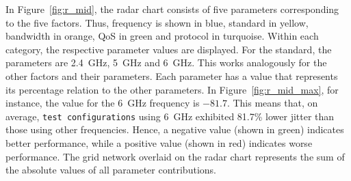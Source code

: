 In Figure~\ref{fig:r_mid}, the radar chart consists of five parameters corresponding to the five factors.  
Thus, frequency is shown in blue, standard in yellow, bandwidth in orange, \ac{QoS} in green and protocol in turquoise.  
Within each category, the respective parameter values are displayed.
For the standard, the parameters are 2.4~GHz, 5~GHz and 6~GHz.
This works analogously for the other factors and their parameters.  
Each parameter has a value that represents its percentage relation to the other parameters.  
In Figure~\ref{fig:r_mid_max}, for instance, the value for the 6~GHz frequency is $-81.7$.  
This means that, on average, \texttt{test configurations} using 6~GHz exhibited 81.7\% lower jitter than those using other frequencies.  
Hence, a negative value (shown in green) indicates better performance, while a positive value (shown in red) indicates worse performance.  
The grid network overlaid on the radar chart represents the sum of the absolute values of all parameter contributions.  

